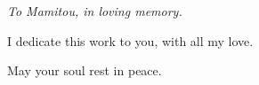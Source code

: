 \dedicace

\vspace*{2cm}
\begin{center}
\begin{minipage}{0.75\textwidth}
\centering
\itshape
To Mamitou, in loving memory.

\medskip
I dedicate this work to you, with all my love.

\medskip
May your soul rest in peace.
\end{minipage}
\end{center}
